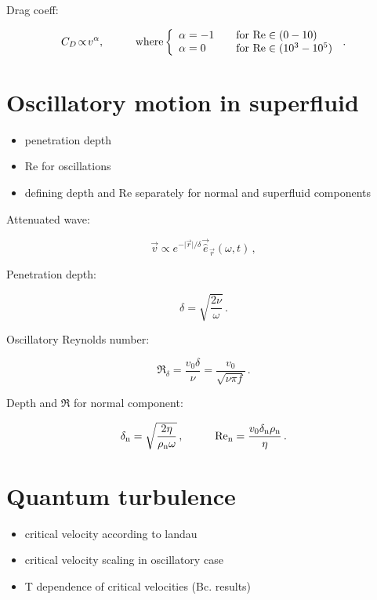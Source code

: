 Drag coeff:

$$
C_D \!\propto\! v^\alpha, \hspace{1cm}
\text{where}
\left\{
  \begin{array}{l l}
    \alpha=-1 & \quad \text{for $\Re \in (0-10)$}\\
    \alpha=0 & \quad \text{for $\Re \in (10^3-10^5)$}
  \end{array}
\right.\,.
$$


\section{Oscillatory motion in superfluid}
\begin{itemize}
	\item penetration depth
	\item Re for oscillations
	\item defining depth and Re separately for normal and superfluid components
\end{itemize}

Attenuated wave:

\begin{equation}
\vec{v} \propto e^{-\vert\vec{r}\vert/\delta} \vec{\hat{e}}_{\vec{r}}(\omega, t)\,,
\label{v_pen}
\end{equation}

Penetration depth:

\begin{equation}
\delta = \sqrt{\frac{2\nu}{\omega}}\,.
\label{penetration}
\end{equation}

Oscillatory Reynolds number:

\begin{equation}
\Re_{\delta} = \frac{v_0 \delta}{\nu} = \frac{v_0}{\sqrt{\nu \pi f}} \,.
\label{Re*}
\end{equation}

Depth and $\Re$ for normal component:

\begin{equation}
\delta_{\ind n} = \sqrt{\frac{2\eta}{\rho_{\ind n}\omega}}\,,
\hspace{1cm}
\Re_{\ind n} = \frac{v_0 \delta_{\ind n} \rho_{\ind n}}{\eta}
\label{twofluid}\,.
\end{equation}


\section{Quantum turbulence}
\begin{itemize}
	\item critical velocity according to landau
	\item critical velocity scaling in oscillatory case
	\item T dependence of critical velocities (Bc. results)
\end{itemize}

